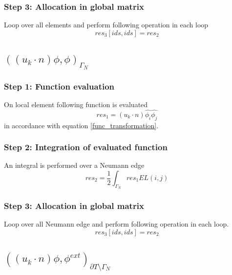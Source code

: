 \documentclass[a4paper]{book}
\begin{document}
\subsubsection{Step 3: Allocation in global matrix}

Loop over all elements and perform following operation in each loop 
\begin{equation}
res_3[ids,ids]=res_2
\end{equation}

\subsection{$((u_k \cdot n)\phi , \phi)_{\Gamma_N}$} 

\subsubsection{Step 1: Function evaluation}

On local element following function is evaluated 
\begin{equation}
res_1 = (u_k \cdot n) \hat{\phi_i} \hat{\phi_j}
\end{equation} 
in accordance with equation \ref{func_transformation}.\\

\subsubsection{Step 2: Integration of evaluated function}

An integral is performed over a Neumann edge 
\begin{equation}
res_2 = \frac{1}{2}  \int_{\Gamma_N} res_1 EL(i,j)
\end{equation}

\subsubsection{Step 3: Allocation in global matrix}

Loop over all Neumann edge and perform following operation in each loop.
\begin{equation}
res_3[ids,ids] = res_2
\end{equation}

\subsection{$((u_k \cdot n)\phi,\phi^{ext})_{\partial T \setminus \Gamma_N}$}
\end{document}
